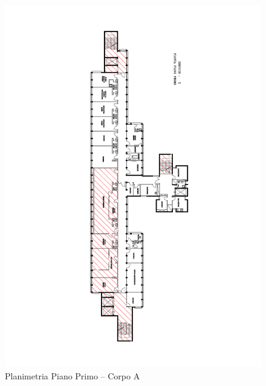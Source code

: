 \begin{figure}
	\centering
		\includegraphics[width=\hsize]{6_2_cap/img/P1}
			\caption{Planimetria Piano Primo -- Corpo A}
			\label{img:P1}
\end{figure}
